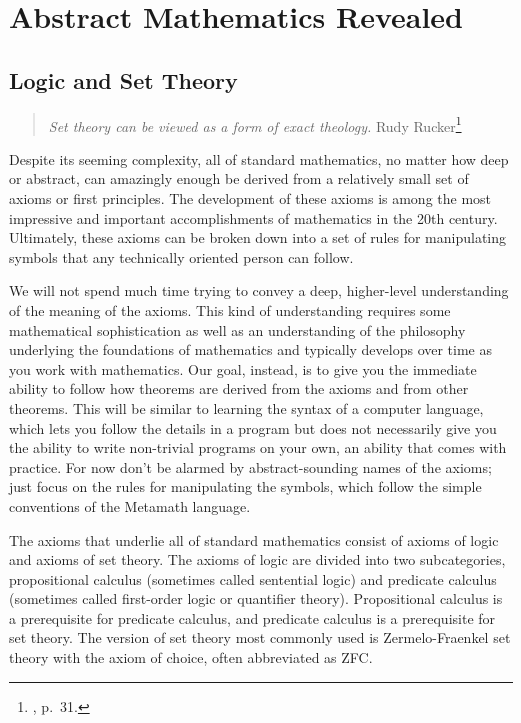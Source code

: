 \chapter{Abstract Mathematics Revealed}\label{fol}

\section{Logic and Set Theory}\label{logicandsettheory}

\begin{quote}
  {\em Set theory can be viewed as a form of exact theology.}
  \flushright\sc  Rudy Rucker\footnote{\cite{Barrow}, p.~31.}\\
\end{quote}

Despite its seeming complexity, all of standard mathematics, no matter how
deep or abstract, can amazingly enough be derived from a relatively small set
of axioms or first principles. The development of these axioms is
among the most impressive and important accomplishments of mathematics in the
20th century. Ultimately, these axioms can be broken down into a set of rules
for manipulating symbols that any technically oriented person can follow.

We will not spend much time trying to convey a deep, higher-level
understanding of the meaning of the axioms. This kind of understanding
requires some mathematical sophistication as well as an understanding of the
philosophy underlying the foundations of mathematics and typically develops
over time as you work with mathematics.  Our goal, instead, is to give you the
immediate ability to follow how theorems are derived from the
axioms and from other theorems.  This will be similar to learning the syntax
of a computer language, which lets you follow the details in a program but
does not necessarily give you the ability to write non-trivial programs on
your own, an ability that comes with practice. For now don't be alarmed by
abstract-sounding names of the axioms; just focus on the rules for
manipulating the symbols, which follow the simple conventions of the
Metamath language.

The axioms that underlie all of standard mathematics consist of axioms of logic
and axioms of set theory. The axioms of logic are divided into two
subcategories, propositional calculus (sometimes
called sentential logic) and predicate calculus
(sometimes called first-order logic or quantifier theory).  Propositional
calculus is a prerequisite for predicate calculus, and predicate calculus is a
prerequisite for set theory.  The version of set theory most commonly used is
Zermelo-Fraenkel set theory
with the axiom of choice,
often abbreviated as ZFC.

